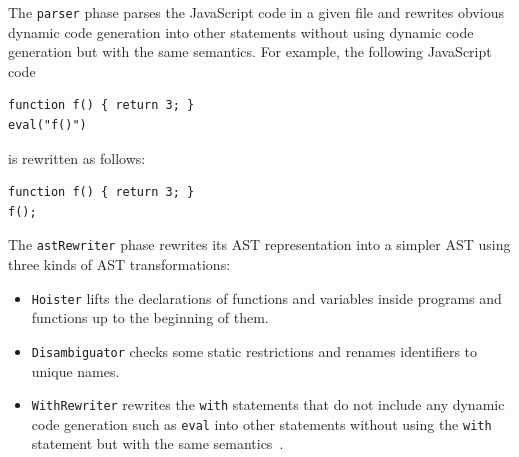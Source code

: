 \medskip
The \verb!parser! phase parses the JavaScript code in a given file and
rewrites obvious dynamic code generation into other statements without using
dynamic code generation but with the same semantics.  For example, the following
JavaScript code
\begin{verbatim}
function f() { return 3; }
eval("f()")
\end{verbatim}
is rewritten as follows:
\begin{verbatim}
function f() { return 3; }
f();
\end{verbatim}

\medskip
The \verb!astRewriter! phase rewrites its AST representation into a simpler AST
using three kinds of AST transformations:
\begin{itemize}
\item \verb!Hoister! lifts the declarations of functions and variables inside
programs and functions up to the beginning of them.
\item \verb!Disambiguator! checks some static restrictions and renames identifiers
to unique names.
\item \verb!WithRewriter! rewrites the \verb!with! statements that do not include
any dynamic code generation such as \verb!eval! into other statements without using
the \verb!with! statement but with the same semantics~\cite{dls13,withtr}.
\end{itemize}


